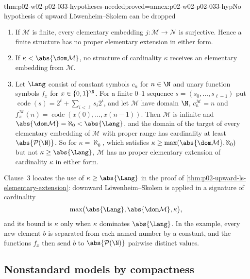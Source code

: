\begin{hbtheorem}{thm:p02-w02-p02-033-hypotheses-needed}{proved=annex:p02-w02-p02-033-hyp}{No hypothesis of upward L\"owenheim--Skolem can be dropped}
\begin{enumerate}
  \item If \(\mathcal M\) is finite, every elementary embedding
        \(j:\mathcal M\to\mathcal N\) is surjective.  Hence a finite
        structure has no proper elementary extension in either form.
  \item If \(\kappa<\abs{\dom\mathcal M}\), no structure of cardinality
        \(\kappa\) receives an elementary embedding from \(\mathcal M\).
  \item Let \(\Lang\) consist of constant symbols \(c_n\) for
        \(n\in\N\) and unary function symbols \(f_x\) for
        \(x\in\{0,1\}^{\N}\).  For a finite \(0\)--\(1\) sequence
        \(s=(s_0,\ldots,s_{\ell-1})\) put
        \(\operatorname{code}(s)=2^{\ell}+\sum_{i<\ell}s_i2^i\), and let
        \(\mathcal M\) have domain \(\N\), \(c_n^{\mathcal M}=n\) and
        \(f_x^{\mathcal M}(n)=\operatorname{code}(x(0),\ldots,x(n-1))\).
        Then \(\mathcal M\) is infinite and
        \(\abs{\dom\mathcal M}=\aleph_0<\abs{\Lang}\), and the domain of the
        target of every elementary embedding of \(\mathcal M\) with proper
        range has cardinality at least \(\abs{\mathcal P(\N)}\).  So for
        \(\kappa=\aleph_0\), which satisfies
        \(\kappa\geq\max(\abs{\dom\mathcal M},\aleph_0)\) but not
        \(\kappa\geq\abs{\Lang}\), \(\mathcal M\) has no proper elementary
        extension of cardinality \(\kappa\) in either form.
\end{enumerate}
\end{hbtheorem}

Clause~3 locates the use of \(\kappa\geq\abs{\Lang}\) in the proof of
\cref{thm:p02-upward-ls-elementary-extension}: downward
L\"owenheim--Skolem is applied in a signature of cardinality
\[
 \max\bigl(\abs{\Lang},\abs{\dom\mathcal M},\kappa\bigr),
\]
and its bound is \(\kappa\) only when \(\kappa\) dominates \(\abs{\Lang}\).  In the example,
every new element \(b\) is separated from each named number by a constant,
and the functions \(f_x\) then send \(b\) to \(\abs{\mathcal P(\N)}\)
pairwise distinct values.

\subsection{Nonstandard models by compactness}
\label{sec:p02-w02-p02-033-nonstandard}

